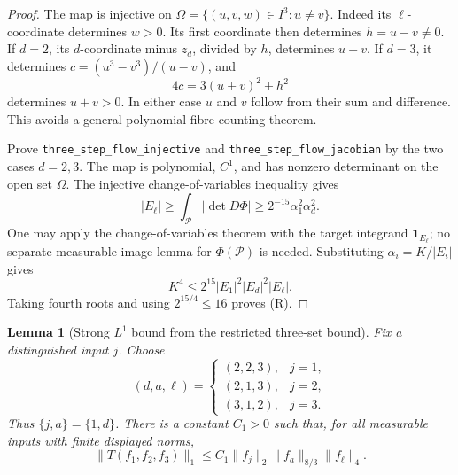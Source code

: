 \documentclass[11pt]{article}
\newtheorem{lemma}{Lemma}[section]
\begin{document}
\begin{proof}
The map is injective on $\Omega=\{(u,v,w)\in I^3:u\ne v\}$. Indeed its
$\ell$-coordinate determines $w>0$. Its first coordinate then determines
$h=u-v\ne0$. If $d=2$, its $d$-coordinate minus $z_d$, divided by $h$, determines $u+v$.
If $d=3$, it determines $c=(u^3-v^3)/(u-v)$, and
\[
 4c=3(u+v)^2+h^2
\]
determines $u+v>0$. In either case $u$ and $v$ follow from their sum and
difference. This avoids a general polynomial fibre-counting theorem.

Prove \texttt{three\_step\_flow\_injective} and
\texttt{three\_step\_flow\_jacobian} by the two cases $d=2,3$.
The map is polynomial, $C^1$, and has nonzero determinant on the open set
$\Omega$. The injective change-of-variables inequality gives
\[
 |E_\ell|\geq\int_{\mathcal P}|\det D\Phi|
 \geq 2^{-15}\alpha_1^2\alpha_d^2.                 \tag{J2}
\]
One may apply the change-of-variables theorem with the target integrand
$\mathbf1_{E_\ell}$; no separate measurable-image lemma for
$\Phi(\mathcal P)$ is needed. Substituting $\alpha_i=K/|E_i|$ gives
\[
 K^4\leq2^{15}|E_1|^2|E_d|^2|E_\ell|.
\]
Taking fourth roots and using $2^{15/4}\leq16$ proves (R).
\end{proof}

\begin{lemma}[Strong $L^1$ bound from the restricted three-set bound]
\label{lem:three-set-strong-upper-half}
Fix a distinguished input $j$. Choose
\[
 (d,a,\ell)=
 \begin{cases}
  (2,2,3),&j=1,\\
  (2,1,3),&j=2,\\
  (3,1,2),&j=3.
 \end{cases}
\]
Thus $\{j,a\}=\{1,d\}$. There is a constant $C_1>0$ such that, for all measurable inputs with finite displayed norms,
\[
 \|T(f_1,f_2,f_3)\|_1
 \leq C_1\|f_j\|_2\|f_a\|_{8/3}\|f_\ell\|_4.       \tag{S}
\]
\end{lemma}
\end{document}
